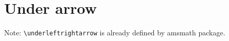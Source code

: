 \documentclass{article}
\begin{document}
\section{Under arrow}

Note: \texttt{\textbackslash underleftrightarrow} is already defined by
\textsf{amsmath} package.

\begin{dispExample}
\end{dispExample}
\end{document}
